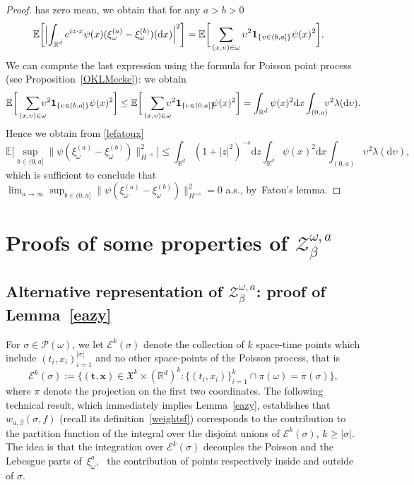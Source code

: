 \documentclass[10pt]{amsart}
\let\mathcal\mathscr
\let\sep:
\theoremstyle{definition}
\newcommand{\bt}{\boldsymbol{t}}
\newcommand{\bx}{\boldsymbol{x}}
\newcommand{\dd}{\mathrm{d}}
\newcommand{\ind}{\mathbf{1}}
\newcommand{\cE}{{\ensuremath{\mathcal E}} }
\newcommand{\cP}{{\ensuremath{\mathcal P}} }
\newcommand{\cZ}{{\ensuremath{\mathcal Z}} }
\newcommand{\bbE}{{\ensuremath{\mathbb E}} }
\newcommand{\bbR}{{\ensuremath{\mathbb R}} }
\let\gb\beta
\let\gl\lambda
\let\ups\upsilon
\let\go\omega
\begin{document}
\begin{proof}
has zero mean, we obtain that for any $a>b>0$
\begin{equation*}
\begin{split}
\bbE \biggl[\Bigl | \int_{\bbR^{\bar d}} e^{i z\cdot x} \psi(x)(\xi_{\go}^{(a)}-\xi_{\go}^{(b)})(\dd x) \Bigr|^2 \biggr]
& = \bbE \bigg[ \sum_{(x,\ups)\in \go} \ups^{2} \ind_{\{\ups\in (b,a]\}}\psi(x)^2 \bigg].
\end{split}
\end{equation*}
We can compute the last expression using the formula for Poisson point process (see Proposition~\ref{OKLMecke}): we obtain\vspace*{-5pt}
\[
\bbE \bigg[ \sum_{(x,\ups)\in \go}\hspace*{-2.5mm} \ups^{2} \ind_{\{\ups\in (b,a]\}}\psi(x)^2 \bigg] \le \bbE \bigg[ \sum_{(x,\ups)\in \go} \hspace*{-2.5mm}\ups^{2} \ind_{\{\ups\in (0,a]\}} \hspace*{-1mm}\psi(x)^2 \bigg]
= \int_{\bbR^{\bar d}} \psi(x)^2 \dd x \int_{(0,a)}\hspace*{-2mm} \ups^2 \gl(\dd \ups).
\]
Hence we obtain from \eqref{lefatoux}
\begin{equation*}
\bbE \bigg[ \sup_{b\in(0,a]}\|\psi(\xi_{\go}^{(a)}-\xi_{\go}^{(b)})\|^2_{H^{-s}}\bigg]\le \int_{\bbR^{\bar d}} (1+|z|^2)^{-s} \dd z \int_{\bbR^{\bar d}} \psi(x)^2 \dd x \int_{(0,a)} \ups^2 \gl(\dd \ups),
\end{equation*}
which is sufficient to conclude that $\lim_{a\to \infty} \sup_{b\in(0,a]}\|\psi(\xi_{\go}^{(a)}-\xi_{\go}^{(b)}) \|^2_{H^{-s}}=0$ a.s., by~Fatou's lemma.
\end{proof}

\section{Proofs of some properties of \texorpdfstring{$\cZ_{\gb}^{\go,a}$}{Z}}
\label{app:conti}

\subsection{Alternative representation of \texorpdfstring{$\cZ_{\gb}^{\go,a}$}{Z}: proof of Lemma~\ref{eazy}}
\label{app:eazy}

For $\sigma\in \cP(\go)$, we let $\cE^k(\sigma)$ denote the collection of $k$ space-time points which include $(t_i,x_i)_{i=1}^{|\sigma|}$ and no other space-points of the Poisson process, that is
\begin{equation}
\cE^k(\sigma):= \{ (\bt,\bx)\in \mathfrak{X}^k\times (\bbR^d)^k \sep \{(t_i,x_i)\}_{i=1}^k\cap \pi(\go)= \pi(\sigma) \},
\end{equation}
where $\pi$ denote the projection on the first two coordinates.
The following technical result, which immediately implies Lemma~\ref{eazy}, establishes that $w_{a,\beta}(\sigma,f)$ (recall its definition~\eqref{weightsf}) corresponds to the contribution to the partition function of the integral over the disjoint unions of $ \cE^k(\sigma)$, $k\ge |\sigma|$.
The idea is that the integration over $\cE^k(\sigma)$ decouples the Poisson and the Lebesgue parts of~$\xi_{\go}^{a}$,
\ie \ the contribution of points respectively inside and outside of $\sigma$.
\end{document}
